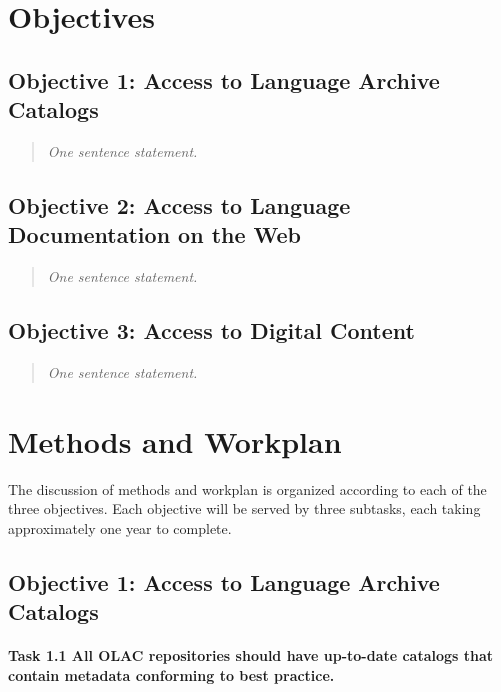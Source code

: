 \section{Objectives}


\subsection*{Objective 1: Access to Language Archive Catalogs}

\begin{quote}
{\it
  One sentence statement.
}
\end{quote}

\subsection*{Objective 2: Access to Language Documentation on the Web}

\begin{quote}
{\it
  One sentence statement.
}
\end{quote}

\subsection*{Objective 3: Access to Digital Content}

\begin{quote}
{\it
  One sentence statement.
}
\end{quote}

\section{Methods and Workplan}

The discussion of methods and workplan is organized according to
each of the three objectives.  Each objective will be served by
three subtasks, each taking approximately one year to complete.


\subsection*{Objective 1: Access to Language Archive Catalogs}

\def\task{1.1}
\paragraph{Task {\task} All OLAC repositories should have up-to-date catalogs
      that contain metadata conforming to best practice.}

